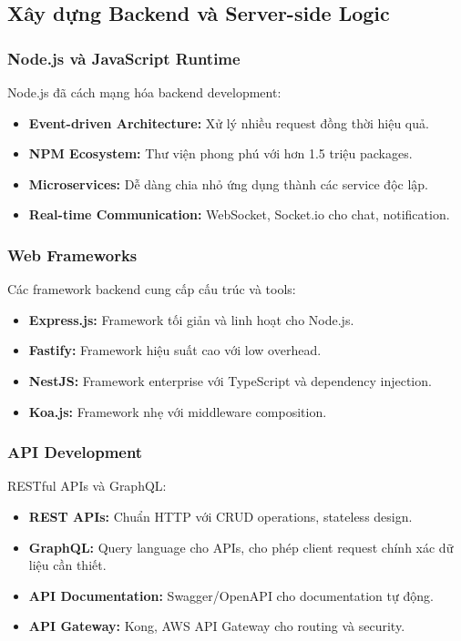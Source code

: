 \documentclass[a4paper,12pt]{report}
\begin{document}
\subsection{Xây dựng Backend và Server-side Logic}

\subsubsection{Node.js và JavaScript Runtime}
Node.js đã cách mạng hóa backend development:
\begin{itemize}
    \item \textbf{Event-driven Architecture:} Xử lý nhiều request đồng thời hiệu quả.
    \item \textbf{NPM Ecosystem:} Thư viện phong phú với hơn 1.5 triệu packages.
    \item \textbf{Microservices:} Dễ dàng chia nhỏ ứng dụng thành các service độc lập.
    \item \textbf{Real-time Communication:} WebSocket, Socket.io cho chat, notification.
\end{itemize}

\subsubsection{Web Frameworks}
Các framework backend cung cấp cấu trúc và tools:
\begin{itemize}
    \item \textbf{Express.js:} Framework tối giản và linh hoạt cho Node.js.
    \item \textbf{Fastify:} Framework hiệu suất cao với low overhead.
    \item \textbf{NestJS:} Framework enterprise với TypeScript và dependency injection.
    \item \textbf{Koa.js:} Framework nhẹ với middleware composition.
\end{itemize}

\subsubsection{API Development}
RESTful APIs và GraphQL:
\begin{itemize}
    \item \textbf{REST APIs:} Chuẩn HTTP với CRUD operations, stateless design.
    \item \textbf{GraphQL:} Query language cho APIs, cho phép client request chính xác dữ liệu cần thiết.
    \item \textbf{API Documentation:} Swagger/OpenAPI cho documentation tự động.
    \item \textbf{API Gateway:} Kong, AWS API Gateway cho routing và security.
\end{itemize}
\end{document}
